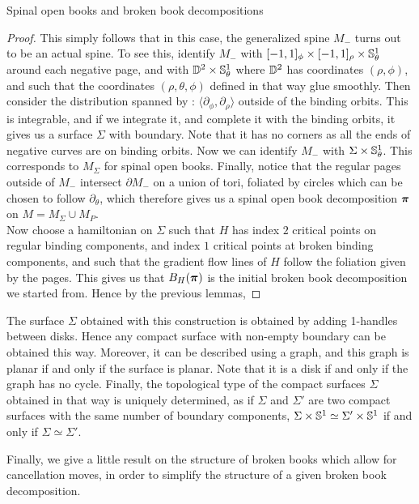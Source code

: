 \documentclass[../main.tex]{subfiles}
\begin{document}
\begin{section}{Spinal open books and broken book decompositions}
\begin{proof}
This simply follows that in this case, the generalized spine $M_-$ turns out to be an actual spine. To see this, identify $M_-$ with $[-1,1]_\phi\times [-1,1]_\rho\times \mathbb{S}^1_\theta$ around each negative page, and with $\mathbb{D}^2\times \mathbb{S}^1_\theta$ where $\mathbb{D}^2$ has coordinates $(\rho,\phi)$, and such that the coordinates $(\rho,\theta,\phi)$ defined in that way glue smoothly. Then consider the distribution spanned by : $\langle \partial_\phi,\partial_\rho\rangle $ outside of the binding orbits. This is integrable, and if we integrate it, and complete it with the binding orbits, it gives us a surface $\Sigma$ with boundary. Note that it has no corners as all the ends of negative curves are on binding orbits. Now we can identify $M_-$ with $\Sigma\times \mathbb{S}^1_\theta$. This corresponds to $M_\Sigma$ for spinal open books. Finally, notice that the regular pages outside of $M_-$ intersect $\partial M_-$ on a union of tori, foliated by circles which can be chosen to follow $\partial_\theta$, which therefore gives us a spinal open book decomposition $\boldsymbol{\pi}$ on $M = M_\Sigma\cup M_P$. \\
Now choose a hamiltonian on $\Sigma$ such that $H$ has index $2$ critical points on regular binding components, and index $1$ critical points at broken binding components, and such that the gradient flow lines of $H$ follow the foliation given by the pages. This gives us that $B_H(\boldsymbol{\pi})$ is the initial broken book decomposition we started from. Hence by the previous lemmas, 
\end{proof}

\begin{remark}
    The surface $\Sigma$ obtained with this construction is obtained by adding 1-handles between disks. Hence any compact surface with non-empty boundary can be obtained this way. Moreover, it can be described using a graph, and this graph is planar if and only if the surface is planar. Note that it is a disk if and only if the graph has no cycle. Finally, the topological type of the compact surfaces $\Sigma$ obtained in that way is uniquely determined, as if $\Sigma$ and $\Sigma'$ are two compact surfaces with the same number of boundary components, $\Sigma\times \mathbb{S}^1\simeq \Sigma'\times \mathbb{S}^1$ if and only if $\Sigma\simeq \Sigma'$.
\end{remark}

Finally, we give a little result on the structure of broken books which allow for cancellation moves, in order to simplify the structure of a given broken book decomposition.


\end{section}
\end{document}
